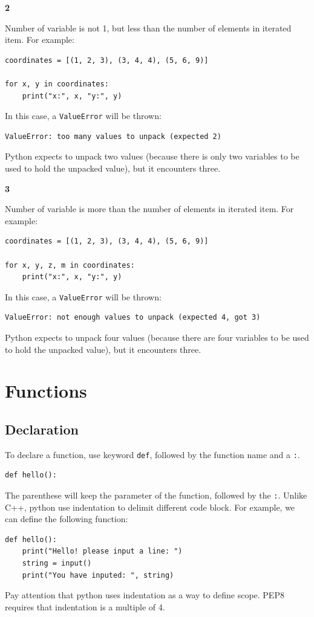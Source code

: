 \documentclass[12pt]{book}
\begin{document}
\textbf{2}

Number of variable is not 1, but less than the number of elements in iterated item. For example:
\begin{verbatim}
coordinates = [(1, 2, 3), (3, 4, 4), (5, 6, 9)]

for x, y in coordinates:
    print("x:", x, "y:", y)
\end{verbatim}
In this case, a \texttt{ValueError} will be thrown:
\begin{verbatim}
ValueError: too many values to unpack (expected 2)
\end{verbatim}
Python expects to unpack two values (because there is only two variables to be used to hold the unpacked value), but it encounters three.

\textbf{3}

Number of variable is more than the number of elements in iterated item. For example:
\begin{verbatim}
coordinates = [(1, 2, 3), (3, 4, 4), (5, 6, 9)]

for x, y, z, m in coordinates:
    print("x:", x, "y:", y)
\end{verbatim}
In this case, a \texttt{ValueError} will be thrown:
\begin{verbatim}
ValueError: not enough values to unpack (expected 4, got 3)
\end{verbatim}
Python expects to unpack four values (because there are four variables to be used to hold the unpacked value), but it encounters three.

\chapter{Functions}
\label{sec:org58ffb6f}
\section{Declaration}
\label{sec:org76ec48e}
To declare a function, use keyword \texttt{def}, followed by the function name and a \texttt{:}.
\begin{verbatim}
def hello():
\end{verbatim}
The parenthese will keep the parameter of the function, followed by the \texttt{:}. Unlike C++, python use indentation to delimit different code block. For example, we can define the following function:
\begin{verbatim}
def hello():
    print("Hello! please input a line: ")
    string = input()
    print("You have inputed: ", string)
\end{verbatim}
Pay attention that python uses indentation as a way to define scope. PEP8 requires that indentation is a multiple of 4.
\end{document}
